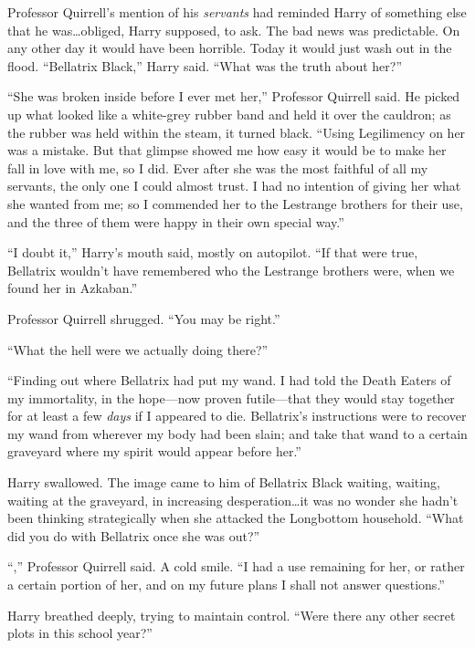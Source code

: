 Professor Quirrell’s mention of his \emph{servants} had reminded Harry of
something else that he was…obliged, Harry supposed, to ask. The bad
news was predictable. On any other day it would have been horrible. Today it
would just wash out in the flood. “Bellatrix Black,” Harry said. “What was the
truth about her?”

“She was broken inside before I ever met her,” Professor Quirrell said. He
picked up what looked like a white-grey rubber band and held it over the
cauldron; as the rubber was held within the steam, it turned black. “Using
Legilimency on her was a mistake. But that glimpse showed me how easy it would
be to make her fall in love with me, so I did. Ever after she was the most
faithful of all my servants, the only one I could almost trust. I had no
intention of giving her what she wanted from me; so I commended her to the
Lestrange brothers for their use, and the three of them were happy in their own
special way.”

“I doubt it,” Harry’s mouth said, mostly on autopilot. “If that were true,
Bellatrix wouldn’t have remembered who the Lestrange brothers were, when we
found her in Azkaban.”

Professor Quirrell shrugged. “You may be right.”

“What the hell were we actually doing there?”

“Finding out where Bellatrix had put my wand. I had told the Death Eaters of my
immortality, in the hope—now proven futile—that they would stay together
for at least a few \emph{days} if I appeared to die. Bellatrix’s instructions
were to recover my wand from wherever my body had been slain; and take that
wand to a certain graveyard where my spirit would appear before her.”

Harry swallowed. The image came to him of Bellatrix Black waiting, waiting,
waiting at the graveyard, in increasing desperation…it was no wonder
she hadn’t been thinking strategically when she attacked the Longbottom
household. “What did you do with Bellatrix once she was out?”

“,” Professor Quirrell
said. A cold smile. “I had a use remaining for her, or rather a certain portion
of her, and on my future plans I shall not answer questions.”

Harry breathed deeply, trying to maintain control. “Were there any other secret
plots in this school year?”

